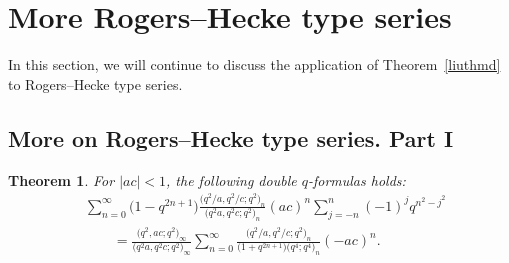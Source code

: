 \documentclass[10pt,a4paper]{amsart}
\numberwithin{equation}{section}
\newtheorem{Theorem}{Theorem}[section]
\begin{document}
\section{More Rogers--Hecke type series}\label{sec8}
In this section, we will continue to discuss the application of Theorem~\ref{liuthmd} to Rogers--Hecke type series.
\subsection{More on Rogers--Hecke type series. Part I}
\begin{Theorem}\label{rogersheck:n1} For $|ac|<1$, the following double $q$-formulas holds:
\begin{align}
&\sum_{n=0}^\infty \bigl(1-q^{2n+1}\bigr) \frac{\bigl(q^2/a, q^2/c; q^2\bigr)_n}{\bigl(q^2 a, q^2c; q^2\bigr)_n} (ac)^n \sum_{j=-n}^n (-1)^j q^{n^2-j^2}\nonumber\\
&\qquad{}=\frac{\bigl(q^2, ac; q^2\bigr)_\infty}{\bigl(q^2 a, q^2 c; q^2\bigr)_\infty}	
\sum_{n=0}^\infty \frac{\bigl(q^2/a, q^2/c; q^2\bigr)_n}{\bigl(1+q^{2n+1}\bigr)\bigl(q^4; q^4\bigr)_n} (-ac)^n.\label{rht:eqn1}	
\end{align}
\end{Theorem}
\end{document}
